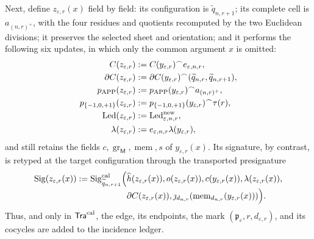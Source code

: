 Next, define \(z_{\varepsilon,r}(x)\) field by field: its configuration is
\(\widetilde q_{n,r+1}\); its complete cell is \(a_{(n,r)^+}\), with the four
residues and quotients recomputed by the two Euclidean divisions; it preserves
the selected sheet and orientation; and it performs the following six updates,
in which only the common argument \(x\) is omitted:
\begin{equation}
\begin{aligned}
 C(z_{\varepsilon,r})&:=C(y_{\varepsilon,r})^\frown
       e_{\varepsilon,n,r},\\
 \partial C(z_{\varepsilon,r})&:=\partial C(y_{\varepsilon,r})^\frown
       (\widetilde q_{n,r},\widetilde q_{n,r+1}),\\
 p_{\mathrm{APP}}(z_{\varepsilon,r})&:=p_{\mathrm{APP}}(y_{\varepsilon,r})^\frown
       a_{(n,r)^+},\\
 p_{\{-1,0,+1\}}(z_{\varepsilon,r})&:=p_{\{-1,0,+1\}}(y_{\varepsilon,r})^\frown
       \tau(r),\\
 \operatorname{Led}(z_{\varepsilon,r})&:=
       \operatorname{Led}^{\rm new}_{\varepsilon,n,r},\\
 \lambda(z_{\varepsilon,r})&:=e_{\varepsilon,n,r}
       \lambda(y_{\varepsilon,r}),
\end{aligned}
 \label{hmtfg:eq:tupla-tra-cal-ch}
\end{equation}
and still retains the fields
\(c,\operatorname{gr}_{\mathsf M},\operatorname{mem},s\) of
\(y_{\varepsilon,r}(x)\). Its signature, by contrast, is retyped at the target
configuration through the transported presignature
\begin{equation}
\begin{aligned}
 \operatorname{Sig}(z_{\varepsilon,r}(x))
  :=\operatorname{Sig}^{\rm cal}_{\widetilde q_{n,r+1}}
       \Bigl(&\widehat h(z_{\varepsilon,r}(x)),
             o(z_{\varepsilon,r}(x)),c(y_{\varepsilon,r}(x)),
             \lambda(z_{\varepsilon,r}(x)),\\[-2pt]
             &\partial C(z_{\varepsilon,r}(x)),
             \jmath_{d_{n,r}}
                (\operatorname{mem}_{d_{n,r}}
                   (y_{\varepsilon,r}(x)))\Bigr).
\end{aligned}
\label{hmtfg:eq:prefirma-transporte-cal-ch}
\end{equation}
Thus, and only in \(\mathsf{Tra}^{\rm cal}\), the edge, its endpoints, the
mark \((\mathfrak p_\varepsilon,r,d_{\varepsilon,r})\), and its cocycles are
added to the incidence ledger.

